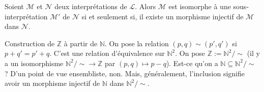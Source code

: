 \documentclass[./main]{subfiles}
\begin{document}
  \begin{prop}
    Soient $\mathcal{M}$ et $\mathcal{N}$ deux interprétations de $\mathcal{L}$. Alors $\mathcal{M}$ est isomorphe à une sous-interprétation $\mathcal{M}'$ de $\mathcal{N}$ si et seulement si, il existe un morphisme injectif de $\mathcal{M}$ dans $\mathcal{N}$.
  \end{prop}

  \begin{exm}
    Construction de $\mathds{Z}$ à partir de $\mathds{N}$.
    On pose la relation $(p, q) \sim (p', q')$ si  $p + q' = p' + q$.
    C'est une relation d'équivalence sur  $\mathds{N}^2$.
    On pose $\mathds{Z} := \mathds{N}^2 / \sim$ (il y a un isomorphisme $\mathds{N}^2 / {\sim} \to \mathds{Z}$ par $(p,q) \mapsto p - q$).
    Est-ce qu'on a $\mathds{N} \subseteq \mathds{N}^2 / {\sim}$ ?
    D'un point de vue ensembliste, non.
    Mais, généralement, l'inclusion signifie avoir un morphisme injectif de $\mathds{N}$ dans $\mathds{N}^2 / {\sim}$.
  \end{exm}
\end{document}
